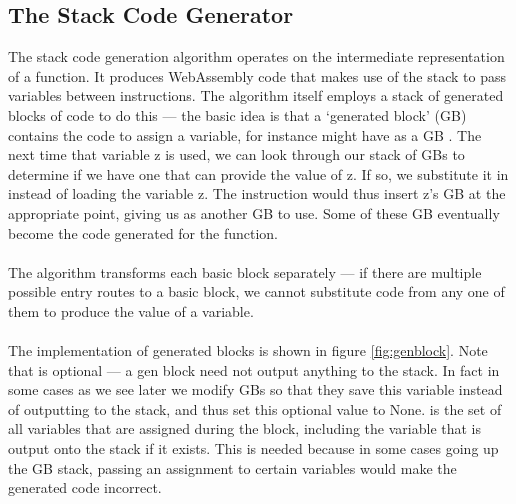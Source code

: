\subsection{The Stack Code Generator}
%
The stack code generation algorithm operates on the intermediate representation of a function. It produces WebAssembly code that makes use of the stack to pass variables between instructions. The algorithm itself employs a stack of generated blocks of code to do this --- the basic idea is that a `generated block' (GB) contains the code to assign a variable, for instance  might have as a GB . The next time that variable z is used, we can look through our stack of GBs to determine if we have one that can provide the value of z. If so, we substitute it in instead of loading the variable z. The instruction  would thus insert z's GB at the appropriate point, giving us  as another GB to use. Some of these GB eventually become the code generated for the function.
\\\\
The algorithm transforms each basic block separately --- if there are multiple possible entry routes to a basic block, we cannot substitute code from any one of them to produce the value of a variable. 
\\\\
The implementation of generated blocks is shown in figure \ref{fig:genblock}. Note that  is optional --- a gen block need not output anything to the stack. In fact in some cases as we see later we modify GBs so that they save this variable instead of outputting to the stack, and thus set this optional value to None.  is the set of all variables that are assigned during the block, including the variable that is output onto the stack if it exists. This is needed because in some cases going up the GB stack, passing an assignment to certain variables would make the generated code incorrect.

